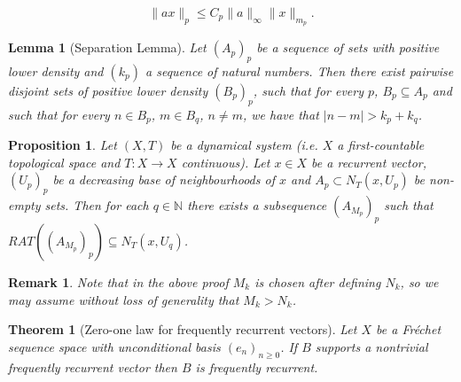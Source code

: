\documentclass[10pt,a4paper]{amsart}
\newtheorem{lemma}{Lemma}
\newtheorem{proposition}{Proposition}
\newtheorem{remark}{Remark}
\newtheorem{theorem}{Theorem}
\newcommand{\sub}{\subseteq}
\newcommand{\zN}{\mathbb N}
\begin{document}
\begin{equation}\label{incondicionalidad}
    \|ax\|_p\le C_p\|a\|_{\infty} \|x\|_{m_p}.
\end{equation} 

\begin{lemma}[Separation Lemma]\label{separation lemma}
Let $(A_p)_p$ be a sequence of sets with positive lower density and $(k_p)$ a sequence of natural numbers. Then there exist pairwise disjoint sets of positive lower density $(B_p)_p$, such that for every $p$, $B_p\sub A_p$ and such that for every $n\in B_p$, $m\in B_q$, $n\ne m$, we have that $|n-m|>k_p+k_q$.
\end{lemma}

\begin{proposition}\label{prop: condic necesaria vectores recurrentes}
    Let $(X,T)$ be a dynamical system (i.e. $X$ a first-countable topological space and $T:X\to X$  continuous). Let $x\in X$ be a recurrent vector, $(U_p)_p$ be a decreasing base of neighbourhoods of $x$ and $A_p\subset N_T(x,U_p)$ be non-empty sets. Then for each $q\in \zN$ there exists a subsequence $(A_{M_p})_p$ such that 
       $RAT((A_{M_p})_p)\subseteq N_T(x,U_q)$. 
\end{proposition}

\begin{remark}\label{rem:M_k>N_k}
    Note that in the above proof $M_k$ is chosen after defining $N_k$, so we may assume without loss of generality that $M_k>N_k$.
\end{remark}

\begin{theorem}[Zero-one law for frequently recurrent vectors]\label{0-1 law frequent recurrence}
Let $X$ be a Fr\'echet sequence space with unconditional basis $(e_n)_{n\geq 0}$. If $B$ supports a nontrivial frequently recurrent vector then $B$ is frequently recurrent.
\end{theorem}
\end{document}
